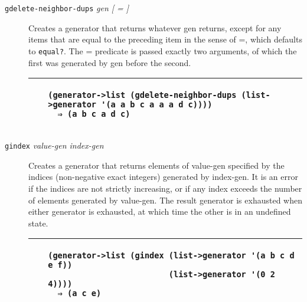 \begin{description}
\item[\texttt{gdelete-neighbor-dups} \emph{gen {[} = {]}}]
Creates a generator that returns whatever gen returns, except for any
items that are equal to the preceding item in the sense of =, which
defaults to \texttt{equal?}. The = predicate is passed exactly two
arguments, of which the first was generated by gen before the second.

\begin{longtable}[]{@{}ll@{}}
\toprule
\begin{minipage}[t]{0.47\columnwidth}\raggedright\strut
~\strut
\end{minipage} & \begin{minipage}[t]{0.47\columnwidth}\raggedright\strut
\begin{verbatim}
(generator->list (gdelete-neighbor-dups (list->generator '(a a b c a a a d c))))
  ⇒ (a b c a d c)
\end{verbatim}
\strut
\end{minipage}\tabularnewline
\bottomrule
\end{longtable}
\end{description}

\begin{description}
\item[\texttt{gindex} \emph{value-gen index-gen}]
Creates a generator that returns elements of value-gen specified by the
indices (non-negative exact integers) generated by index-gen. It is an
error if the indices are not strictly increasing, or if any index
exceeds the number of elements generated by value-gen. The result
generator is exhausted when either generator is exhausted, at which time
the other is in an undefined state.

\begin{longtable}[]{@{}ll@{}}
\toprule
\begin{minipage}[t]{0.47\columnwidth}\raggedright\strut
~\strut
\end{minipage} & \begin{minipage}[t]{0.47\columnwidth}\raggedright\strut
\begin{verbatim}
(generator->list (gindex (list->generator '(a b c d e f))
                         (list->generator '(0 2 4))))
  ⇒ (a c e)
\end{verbatim}
\strut
\end{minipage}\tabularnewline
\bottomrule
\end{longtable}
\end{description}

